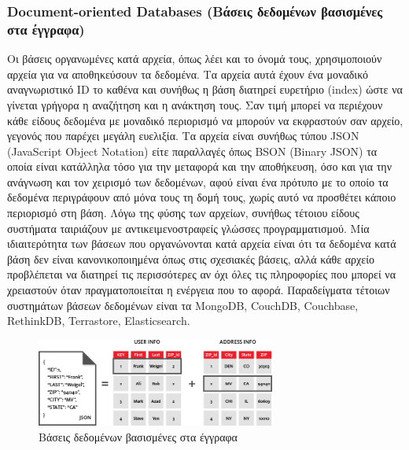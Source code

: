 		\subsubsection{Document-oriented Databases (Βάσεις δεδομένων βασισμένες στα έγγραφα)}
		Οι βάσεις οργανωμένες κατά αρχεία, όπως λέει και το όνομά τους, χρησιμοποιούν αρχεία για να αποθηκεύσουν τα δεδομένα. Τα αρχεία αυτά έχουν ένα μοναδικό αναγνωριστικό ID το καθένα και συνήθως η βάση διατηρεί ευρετήριο (index) ώστε να γίνεται γρήγορα η αναζήτηση και η ανάκτηση τους. Σαν τιμή μπορεί να περιέχουν κάθε είδους δεδομένα με μοναδικό περιορισμό να μπορούν να εκφραστούν σαν αρχείο, γεγονός που παρέχει μεγάλη ευελιξία. Τα αρχεία είναι συνήθως τύπου JSON (JavaScript Object Notation) είτε παραλλαγές όπως BSON (Binary JSON) τα οποία είναι κατάλληλα τόσο για την μεταφορά και την αποθήκευση, όσο και για την ανάγνωση και τον χειρισμό των δεδομένων, αφού είναι ένα πρότυπο με το οποίο τα δεδομένα περιγράφουν από μόνα τους τη δομή τους, χωρίς αυτό να προσθέτει κάποιο περιορισμό στη βάση. Λόγω της φύσης των αρχείων, συνήθως τέτοιου είδους συστήματα ταιριάζουν με αντικειμενοστραφείς γλώσσες προγραμματισμού. Μία ιδιαιτερότητα των βάσεων που οργανώνονται κατά αρχεία είναι ότι τα δεδομένα κατά βάση δεν είναι κανονικοποιημένα όπως στις σχεσιακές βάσεις, αλλά κάθε αρχείο προβλέπεται να διατηρεί τις περισσότερες αν όχι όλες τις πληροφορίες που μπορεί να χρειαστούν όταν πραγματοποιείται η ενέργεια που το αφορά. Παραδείγματα τέτοιων συστημάτων βάσεων δεδομένων είναι τα MongoDB, CouchDB, Couchbase, RethinkDB, Terrastore, Elasticsearch\cite{banker2011mongodb}\cite{redmond2012seven}.
		
	\begin{figure}[h]
	    \centering
	    \includegraphics[width=0.7\textwidth]{document_oriented_db.png}
	    \caption{Βάσεις δεδομένων βασισμένες στα έγγραφα}
	    \label{fig:document_oriented_db}
	\end{figure}
		
